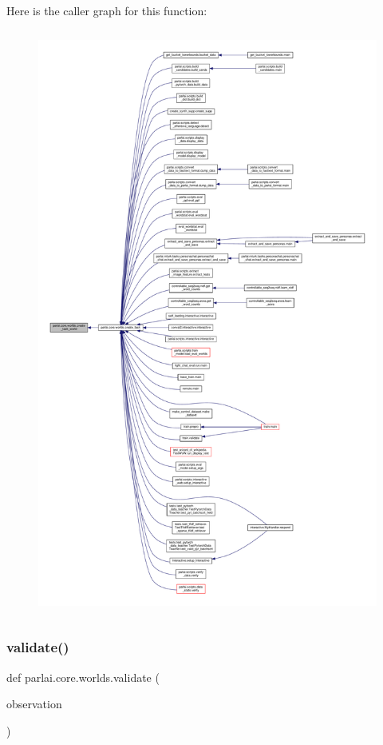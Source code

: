 Here is the caller graph for this function\+:
\nopagebreak
\begin{figure}[H]
\begin{center}
\leavevmode
\includegraphics[height=550pt]{namespaceparlai_1_1core_1_1worlds_a055ee493c9ed03ecff4832f52b408f8c_icgraph}
\end{center}
\end{figure}
\mbox{\label{namespaceparlai_1_1core_1_1worlds_afc3fad603b7bce41dbdc9cdc04a9c794}} 
\subsubsection{\texorpdfstring{validate()}{validate()}}
{\footnotesize\ttfamily def parlai.\+core.\+worlds.\+validate (\begin{DoxyParamCaption}\item[{}]{observation }\end{DoxyParamCaption})}


